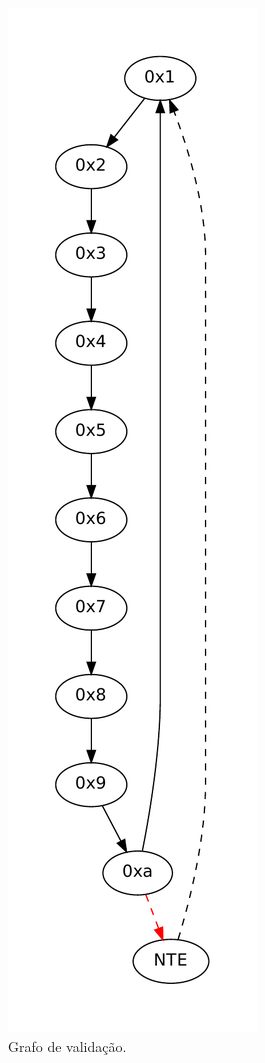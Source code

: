 \documentclass[12pt,twoside]{article}
\begin{document}
\begin{figure}[!h!]
\includegraphics[scale=0.35]{./figs/validacao}
\caption{Grafo de validação.}
\label{fig-validacao}
\end{figure}
\end{document}
